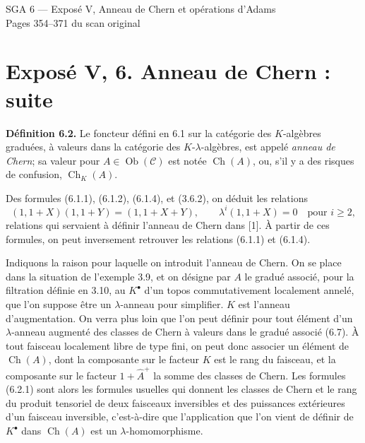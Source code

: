 \documentclass[11pt]{article}
\newcommand{\Gr}{\operatorname{Gr}}
\newcommand{\Fil}{\operatorname{Fil}}
\providecommand{\Gr}{\operatorname{Gr}}
\providecommand{\Gr}{\operatorname{G}}
\begin{document}
\providecommand{\Ghat}{\widehat G}
\providecommand{\Aqhat}{\widehat A_{\mathbb Q}}
\providecommand{\Ch}{\operatorname{Ch}}
\providecommand{\Log}{\operatorname{Log}}
\providecommand{\id}{\operatorname{id}}
\providecommand{\gr}{\operatorname{gr}}
\providecommand{\Hom}{\operatorname{Hom}}
\providecommand{\epsi}{\varepsilon}
\providecommand{\clgr}{\operatorname{cl}}
\providecommand{\Fil}{\operatorname{Fil}}
\providecommand{\Gr}{\operatorname{Gr}}
\providecommand{\Sym}{\operatorname{Sym}}

\begin{center}
{\Large SGA 6 — Exposé V, Anneau de Chern et opérations d'Adams}\\[0.4em]
{\large Pages 354--371 du scan original}
\end{center}


\section*{Exposé V, 6. Anneau de Chern : suite}

\textbf{Définition 6.2.} Le foncteur défini en 6.1 sur la catégorie des \(K\)-algèbres graduées, à valeurs dans la catégorie des \(K\)-\(\lambda\)-algèbres, est appelé \emph{anneau de Chern}; sa valeur pour \(A\in\operatorname{Ob}(\mathscr C)\) est notée \(\Ch(A)\), ou, s'il y a des risques de confusion, \(\Ch_K(A)\).

Des formules (6.1.1), (6.1.2), (6.1.4), et (3.6.2), on déduit les relations
\begin{equation}\tag{6.2.1}
 (1,1+X)(1,1+Y)=(1,1+X+Y),
 \qquad
 \lambda^i(1,1+X)=0\quad\text{pour }i\ge2,
\end{equation}
relations qui servaient à définir l'anneau de Chern dans [1]. À partir de ces formules, on peut inversement retrouver les relations (6.1.1) et (6.1.4).

Indiquons la raison pour laquelle on introduit l'anneau de Chern. On se place dans la situation de l'exemple 3.9, et on désigne par \(A\) le gradué associé, pour la filtration définie en 3.10, au \(K^\bullet\) d'un topos commutativement localement annelé, que l'on suppose être un \(\lambda\)-anneau pour simplifier. \(K\) est l'anneau d'augmentation. On verra plus loin que l'on peut définir pour tout élément d'un \(\lambda\)-anneau augmenté des classes de Chern à valeurs dans le gradué associé (6.7). À tout faisceau localement libre de type fini, on peut donc associer un élément de \(\Ch(A)\), dont la composante sur le facteur \(K\) est le rang du faisceau, et la composante sur le facteur \(1+\widehat A^+\) la somme des classes de Chern. Les formules (6.2.1) sont alors les formules usuelles qui donnent les classes de Chern et le rang du produit tensoriel de deux faisceaux inversibles et des puissances extérieures d'un faisceau inversible, c'est-à-dire que l'application que l'on vient de définir de \(K^\bullet\) dans \(\Ch(A)\) est un \(\lambda\)-homomorphisme.
\end{document}
